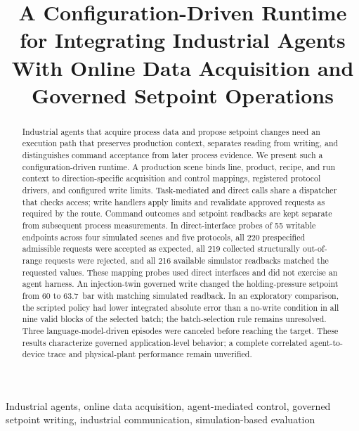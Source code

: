 \documentclass[journal]{IEEEtran}
\begin{document}

\title{A Configuration-Driven Runtime for Integrating Industrial Agents With Online Data Acquisition and Governed Setpoint Operations}

\author{}

\maketitle

\begin{abstract}
Industrial agents that acquire process data and propose setpoint changes need an execution path that preserves production context, separates reading from writing, and distinguishes command acceptance from later process evidence. We present such a configuration-driven runtime. A production scene binds line, product, recipe, and run context to direction-specific acquisition and control mappings, registered protocol drivers, and configured write limits. Task-mediated and direct calls share a dispatcher that checks access; write handlers apply limits and revalidate approved requests as required by the route. Command outcomes and setpoint readbacks are kept separate from subsequent process measurements. In direct-interface probes of 55 writable endpoints across four simulated scenes and five protocols, all 220 prespecified admissible requests were accepted as expected, all 219 collected structurally out-of-range requests were rejected, and all 216 available simulator readbacks matched the requested values. These mapping probes used direct interfaces and did not exercise an agent harness. An injection-twin governed write changed the holding-pressure setpoint from 60 to 63.7~bar with matching simulated readback. In an exploratory comparison, the scripted policy had lower integrated absolute error than a no-write condition in all nine valid blocks of the selected batch; the batch-selection rule remains unresolved. Three language-model-driven episodes were canceled before reaching the target. These results characterize governed application-level behavior; a complete correlated agent-to-device trace and physical-plant performance remain unverified.
\end{abstract}

\begin{IEEEkeywords}
Industrial agents, online data acquisition, agent-mediated control, governed setpoint writing, industrial communication, simulation-based evaluation
\end{IEEEkeywords}
\end{document}
